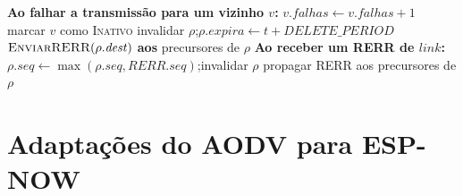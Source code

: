 \begin{algorithm}[H]
\caption{Tratamento de falha de enlace e propagação de RERR}\label{alg:falhas}
\begin{algorithmic}[1]
\Statex \textbf{Ao falhar a transmissão para um vizinho $v$:}
\State $v.\mathit{falhas} \gets v.\mathit{falhas} + 1$
  \State marcar $v$ como \textsc{Inativo}
    \State invalidar $\rho$;\quad $\rho.\mathit{expira} \gets t + \mathit{DELETE\_PERIOD}$
    \State $\Call{EnviarRERR}{\rho.\mathit{dest}}$ \textbf{aos} precursores de $\rho$
  \EndFor
\EndIf
\Statex \textbf{Ao receber um RERR de $\mathit{link}$:}
  \State $\rho.\mathit{seq} \gets \max(\rho.\mathit{seq}, \mathit{RERR}.\mathit{seq})$;\quad invalidar $\rho$
  \State propagar RERR aos precursores de $\rho$
\EndFor
\end{algorithmic}
\end{algorithm}

\section{Adaptações do AODV para ESP-NOW}\label{adaptacoes-do-aodv-para-esp-now}

